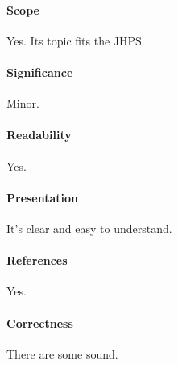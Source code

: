 \documentclass{jhps}
\begin{document}
\paragraph{Scope}   %
Yes. Its topic fits the JHPS.
\paragraph{Significance}   %
Minor.
\paragraph{Readability}   %
Yes.
\paragraph{Presentation}
It's clear and easy to understand.
\paragraph{References}   %
Yes.
\paragraph{Correctness}   %
There are some sound.
\end{document}
